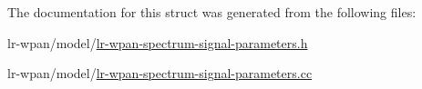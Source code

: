 The documentation for this struct was generated from the following files\+:\begin{DoxyCompactItemize}
\item 
lr-\/wpan/model/\hyperlink{lr-wpan-spectrum-signal-parameters_8h}{lr-\/wpan-\/spectrum-\/signal-\/parameters.\+h}\item 
lr-\/wpan/model/\hyperlink{lr-wpan-spectrum-signal-parameters_8cc}{lr-\/wpan-\/spectrum-\/signal-\/parameters.\+cc}\end{DoxyCompactItemize}
